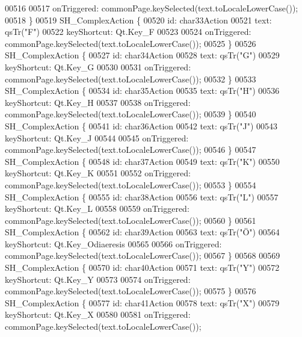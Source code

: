 \begin{DoxyCode}
00516 
00517         onTriggered: commonPage.keySelected(text.toLocaleLowerCase());
00518     \}
00519     SH\_ComplexAction \{
00520         \textcolor{keywordtype}{id}: char33Action
00521         text: qsTr(\textcolor{stringliteral}{"F"})
00522         keyShortcut: Qt.Key\_F
00523 
00524         onTriggered: commonPage.keySelected(text.toLocaleLowerCase());
00525     \}
00526     SH\_ComplexAction \{
00527         \textcolor{keywordtype}{id}: char34Action
00528         text: qsTr(\textcolor{stringliteral}{"G"})
00529         keyShortcut: Qt.Key\_G
00530 
00531         onTriggered: commonPage.keySelected(text.toLocaleLowerCase());
00532     \}
00533     SH\_ComplexAction \{
00534         \textcolor{keywordtype}{id}: char35Action
00535         text: qsTr(\textcolor{stringliteral}{"H"})
00536         keyShortcut: Qt.Key\_H
00537 
00538         onTriggered: commonPage.keySelected(text.toLocaleLowerCase());
00539     \}
00540     SH\_ComplexAction \{
00541         \textcolor{keywordtype}{id}: char36Action
00542         text: qsTr(\textcolor{stringliteral}{"J"})
00543         keyShortcut: Qt.Key\_J
00544 
00545         onTriggered: commonPage.keySelected(text.toLocaleLowerCase());
00546     \}
00547     SH\_ComplexAction \{
00548         \textcolor{keywordtype}{id}: char37Action
00549         text: qsTr(\textcolor{stringliteral}{"K"})
00550         keyShortcut: Qt.Key\_K
00551 
00552         onTriggered: commonPage.keySelected(text.toLocaleLowerCase());
00553     \}
00554     SH\_ComplexAction \{
00555         \textcolor{keywordtype}{id}: char38Action
00556         text: qsTr(\textcolor{stringliteral}{"L"})
00557         keyShortcut: Qt.Key\_L
00558 
00559         onTriggered: commonPage.keySelected(text.toLocaleLowerCase());
00560     \}
00561     SH\_ComplexAction \{
00562         \textcolor{keywordtype}{id}: char39Action
00563         text: qsTr(\textcolor{stringliteral}{"Ö"})
00564         keyShortcut: Qt.Key\_Odiaeresis
00565 
00566         onTriggered: commonPage.keySelected(text.toLocaleLowerCase());
00567     \}
00568 
00569     SH\_ComplexAction \{
00570         \textcolor{keywordtype}{id}: char40Action
00571         text: qsTr(\textcolor{stringliteral}{"Y"})
00572         keyShortcut: Qt.Key\_Y
00573 
00574         onTriggered: commonPage.keySelected(text.toLocaleLowerCase());
00575     \}
00576     SH\_ComplexAction \{
00577         \textcolor{keywordtype}{id}: char41Action
00578         text: qsTr(\textcolor{stringliteral}{"X"})
00579         keyShortcut: Qt.Key\_X
00580 
00581         onTriggered: commonPage.keySelected(text.toLocaleLowerCase());

\end{DoxyCode}
